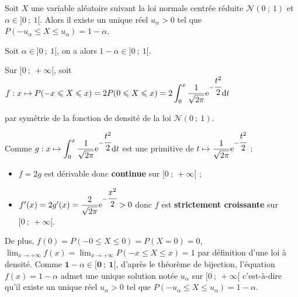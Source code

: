 \documentclass{cornouaille}
\begin{document}
\begin{theoreme}
Soit $X$ une variable aléatoire suivant la loi normale centrée réduite $\mathcal{N}(0\ ;\ 1)$ et $\alpha\in ]0\ ;\ 1[$. Alors il existe un unique réel $u_{\alpha}>0$ tel que $P(-u_{\alpha}\leqslant X\leqslant u_{\alpha})=1-\alpha$.
\end{theoreme}

\begin{preuve}
Soit $\alpha\in]0\ ;\ 1[$, on a alors $1-\alpha\in]0\ ;\ 1[$.



Sur $[0\ ;\ +\infty[$, soit $f:x\mapsto P(-x\leqslant X\leqslant x)=2P(0\leqslant X\leqslant x)=2\displaystyle\int_{0}^{x}\dfrac{1}{\sqrt{2\pi}}\textrm{e}^{-\cfrac{t^2}{2}}\textrm{d}t$


par symétrie de la fonction de densité de la loi $\mathcal{N}(0\ ;\ 1)$.



Comme $g:x\mapsto \displaystyle\int_{0}^{x}\dfrac{1}{\sqrt{2\pi}}\textrm{e}^{-\cfrac{t^2}{2}}\textrm{d} t$ est une primitive de $t\mapsto \dfrac{1}{\sqrt{2\pi}}\textrm{e}^{-\cfrac{t^2}{2}}$ : 
\begin{itemize}
  \item $f=2g$ est dérivable donc \textbf{continue} sur $[0\ ;\ +\infty[$ ;


  \item $f'(x)=2g'(x)=\dfrac{2}{\sqrt{2\pi}}\textrm{e}^{-\cfrac{x^2}{2}}>0$ donc $f$ est \textbf{strictement croissante} sur $[0\ ;\ +\infty[$.
\end{itemize}

De plus, $f(0)=P(-0\leqslant X\leqslant 0)=P(X=0)=0$,
${\displaystyle\lim_{x\rightarrow +\infty} f(x)=\lim_{x\rightarrow
    +\infty} P(-x\leqslant X\leqslant x)=1}$
par définition d'une loi à densité. Comme
$\mathbf{1-}\alpha\mathbf{\in[0\ ;\ 1[}$, d'après le théorème de
bijection, l'équation $f(x)=1-\alpha$ admet une unique solution notée
$u_{\alpha}$ sur $[0\ ;\ +\infty[$ c'est-à-dire qu'il existe un unique
réel $u_{\alpha}> 0$ tel que
$P(-u_{\alpha}\leqslant X\leqslant u_{\alpha})=1-\alpha$.
\end{preuve}
\end{document}

